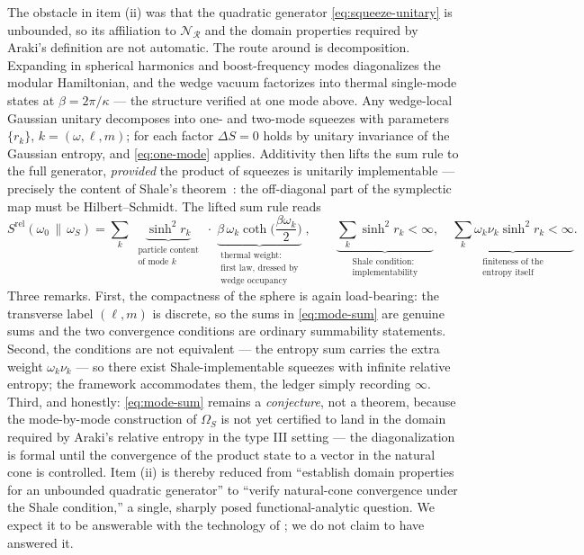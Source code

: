 \documentclass[11pt]{article}
\newcommand{\Srel}{S^{\mathrm{rel}}}
\begin{document}
The obstacle in item (ii) was that the quadratic generator \eqref{eq:squeeze-unitary} is unbounded, so its affiliation to $\mathscr{N}_{\mathcal{R}}$ and the domain properties required by Araki's definition are not automatic. The route around is decomposition. Expanding in spherical harmonics and boost-frequency modes diagonalizes the modular Hamiltonian, and the wedge vacuum factorizes into thermal single-mode states at $\beta = 2\pi/\kappa$ --- the structure verified at one mode above. Any wedge-local Gaussian unitary decomposes into one- and two-mode squeezes with parameters $\{r_k\}$, $k = (\omega, \ell, m)$; for each factor $\Delta S = 0$ holds by unitary invariance of the Gaussian entropy, and \eqref{eq:one-mode} applies. Additivity then lifts the sum rule to the full generator, \emph{provided} the product of squeezes is unitarily implementable --- precisely the content of Shale's theorem~\cite{Shale}: the off-diagonal part of the symplectic map must be Hilbert--Schmidt. The lifted sum rule reads
\begin{equation}
\Srel(\omega_0\,\|\,\omega_S)
= \sum_{k}\;
\underbrace{\sinh^2\! r_k}_{\substack{\text{particle content}\\ \text{of mode } k}}
\;\cdot\;
\underbrace{\beta\,\omega_k \coth\!\Big(\frac{\beta\omega_k}{2}\Big)}_{\substack{\text{thermal weight:}\\ \text{first law, dressed by}\\ \text{wedge occupancy}}}
\;,
\qquad
\underbrace{\sum_k \sinh^2\! r_k < \infty}_{\substack{\text{Shale condition:}\\ \text{implementability}}},
\quad
\underbrace{\sum_k \omega_k \nu_k \sinh^2\! r_k < \infty}_{\substack{\text{finiteness of the}\\ \text{entropy itself}}}.
\label{eq:mode-sum}
\end{equation}
Three remarks. First, the compactness of the sphere is again load-bearing: the transverse label $(\ell, m)$ is discrete, so the sums in \eqref{eq:mode-sum} are genuine sums and the two convergence conditions are ordinary summability statements. Second, the conditions are not equivalent --- the entropy sum carries the extra weight $\omega_k \nu_k$ --- so there exist Shale-implementable squeezes with infinite relative entropy; the framework accommodates them, the ledger simply recording $\infty$. Third, and honestly: \eqref{eq:mode-sum} remains a \emph{conjecture}, not a theorem, because the mode-by-mode construction of $\Omega_S$ is not yet certified to land in the domain required by Araki's relative entropy in the type III setting --- the diagonalization is formal until the convergence of the product state to a vector in the natural cone is controlled. Item (ii) is thereby reduced from ``establish domain properties for an unbounded quadratic generator'' to ``verify natural-cone convergence under the Shale condition,'' a single, sharply posed functional-analytic question. We expect it to be answerable with the technology of \cite{Longo2019,CLR}; we do not claim to have answered it.
\end{document}

